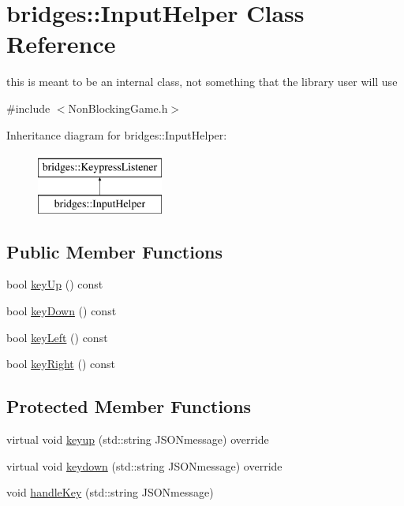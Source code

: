 \hypertarget{classbridges_1_1_input_helper}{}\section{bridges\+::Input\+Helper Class Reference}
\label{classbridges_1_1_input_helper}


this is meant to be an internal class, not something that the library user will use  




{\ttfamily \#include $<$Non\+Blocking\+Game.\+h$>$}

Inheritance diagram for bridges\+::Input\+Helper\+:\begin{figure}[H]
\begin{center}
\leavevmode
\includegraphics[height=2.000000cm]{classbridges_1_1_input_helper}
\end{center}
\end{figure}
\subsection*{Public Member Functions}
\begin{DoxyCompactItemize}
\item 
bool \mbox{\hyperlink{classbridges_1_1_input_helper_a4af008528d2dcb4b985050c2945875fc}{key\+Up}} () const
\item 
bool \mbox{\hyperlink{classbridges_1_1_input_helper_ae40cf213430422a9d99791b6019bbd31}{key\+Down}} () const
\item 
bool \mbox{\hyperlink{classbridges_1_1_input_helper_a3ef3babb68c54e52212025b72de680ea}{key\+Left}} () const
\item 
bool \mbox{\hyperlink{classbridges_1_1_input_helper_aa55f7adc5ef71f39df21f29f16fa0e05}{key\+Right}} () const
\end{DoxyCompactItemize}
\subsection*{Protected Member Functions}
\begin{DoxyCompactItemize}
\item 
virtual void \mbox{\hyperlink{classbridges_1_1_input_helper_a55757d526340d939052cf1dca755262b}{keyup}} (std\+::string J\+S\+O\+Nmessage) override
\item 
virtual void \mbox{\hyperlink{classbridges_1_1_input_helper_a250df70ebe8470f1cb492c17a69c79d7}{keydown}} (std\+::string J\+S\+O\+Nmessage) override
\item 
void \mbox{\hyperlink{classbridges_1_1_input_helper_a587cde926662934e66c9692243b18340}{handle\+Key}} (std\+::string J\+S\+O\+Nmessage)
\end{DoxyCompactItemize}


